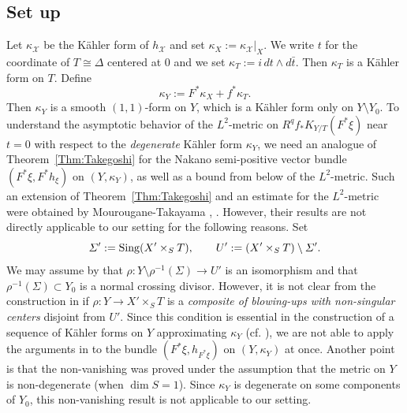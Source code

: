 \documentclass[amscd, leqno]{amsart}
\theoremstyle{plain}
\theoremstyle{definition}
\theoremstyle{remark}
\begin{document}
\subsection
{Set up}
\label{sect:4.2}
\par
Let $\kappa_{\mathcal X}$ be the K\"ahler form of $h_{\mathcal X}$ and set $\kappa_{X} := \kappa_{\mathcal X}|_{X}$.
We write $t$ for the coordinate of $T\cong\varDelta$ centered at $0$ and we set $\kappa_{T} := i\,dt\wedge d\bar{t}$. 
Then $\kappa_{T}$ is a K\"ahler form on $T$. Define
$$
\kappa_{Y} := F^{*}\kappa_{X} + f^{*}\kappa_{T}.
$$
Then $\kappa_{Y}$ is a smooth $(1,1)$-form on $Y$, which is a K\"ahler form only on $Y\setminus Y_{0}$.
To understand the asymptotic behavior of the $L^{2}$-metric on $R^{q}f_{*}K_{Y/T}(F^{*}\xi)$ near $t=0$ with respect to 
the {\em degenerate} K\"ahler form $\kappa_{Y}$, we need an analogue of Theorem~\ref{Thm:Takegoshi} for 
the Nakano semi-positive vector bundle $(F^{*}\xi,F^{*}h_{\xi})$ on $(Y,\kappa_{Y})$, as well as a bound from below of the $L^{2}$-metric. 
Such an extension of Theorem~\ref{Thm:Takegoshi} and an estimate for the $L^{2}$-metric were obtained by 
Mourougane-Takayama \cite[Prop.\,4.4]{MourouganeTakayama09}, \cite[Lemmas 4.7 and 4.8]{MourouganeTakayama09}. 
However, their results are not directly applicable to our setting for the following reasons. Set
$$
\varSigma' := {\rm Sing}(X'\times_{S}T),
\qquad
U' := (X'\times_{S}T)\setminus\varSigma'.
$$
We may assume by \cite[Chap.\,II]{Mumford73} that $\rho \colon Y\setminus \rho^{-1}(\varSigma)\to U'$ is an isomorphism and that 
$\rho^{-1}(\varSigma)\subset Y_{0}$ is a normal crossing divisor. However, it is not clear from the construction in \cite[Chap.\,II]{Mumford73}
if $\rho \colon Y\to X'\times_{S}T$ is a {\em composite of blowing-ups with non-singular centers} disjoint from $U'$. 
Since this condition is essential in the construction of a sequence of K\"ahler forms on $Y$ approximating $\kappa_{Y}$ 
(cf. \cite[Proof of Prop.\,4.4 Step 1]{MourouganeTakayama09}), we are not able to apply the arguments in \cite[Prop.\,4.4]{MourouganeTakayama09} to the bundle $(F^{*}\xi,h_{F^{*}\xi})$ on $(Y,\kappa_{Y})$ at once. 
Another point is that the non-vanishing \cite[Lemmas 4.7 and 4.8]{MourouganeTakayama09} was proved 
under the assumption that the metric on $Y$ is non-degenerate (when $\dim S=1$). 
Since $\kappa_{Y}$ is degenerate on some components of $Y_{0}$, this non-vanishing result is not applicable to our setting. 
\end{document}
